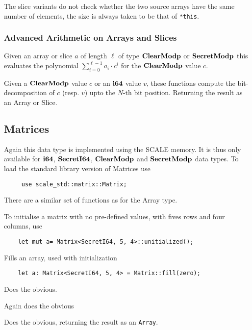 The slice variants do not check whether the two source arrays have
the same number of elements, the size is always taken to be that
of \verb|*this|.

\subsubsection{Advanced Arithmetic on Arrays and Slices}
Given an array or slice $a$ of length $\ell$ of type $\mathbf{ClearModp}$ or
$\mathbf{SecretModp}$ this evaluates the polynomial $\sum_{i=0}^{\ell-1} a_i \cdot c^i$
for the $\mathbf{ClearModp}$ value $c$.

Given a $\mathbf{ClearModp}$ value $c$ or an $\mathbf{i64}$ value $v$, these functions
compute the bit-decomposition of $c$ (resp. $v$) upto the $N$-th bit
position. Returning the result as an Array or Slice.

\subsection{Matrices}
\label{sec:matrices}
Again this data type is implemented using the SCALE memory.
It is thus only available for $\mathbf{i64}$, $\mathbf{SecretI64}$, $\mathbf{ClearModp}$
and $\mathbf{SecretModp}$ data types.
To load the standard library version of Matrices use
\begin{lstlisting}
     use scale_std::matrix::Matrix;
\end{lstlisting}
There are a similar set of functions as for the Array type.

To initialise a matrix with no pre-defined values, with
fives rows and four columns, use
\begin{lstlisting}
    let mut a= Matrix<SecretI64, 5, 4>::unitialized();
\end{lstlisting}


Fills an array, used with initialization
\begin{lstlisting}
    let a: Matrix<SecretI64, 5, 4> = Matrix::fill(zero);
\end{lstlisting}


Does the obvious.

Again does the obvious

Does the obvious, returning the result as an \verb|Array|.

